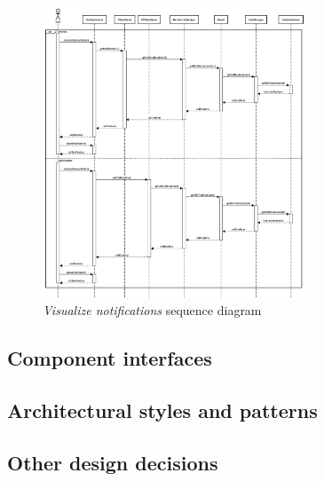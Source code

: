 \begin{enumerate}
\begin{figure}[H]
\begin{center}
        \includegraphics[width=0.7\textwidth]{sequence/viewNotifications.png}
        \caption{\emph{Visualize notifications} sequence diagram}
        \label{fig:sequence9}
        \end{center}
    \end{figure}
    
\end{enumerate}

\subsection{Component interfaces}



\subsection{Architectural styles and patterns}

\subsection{Other design decisions}

